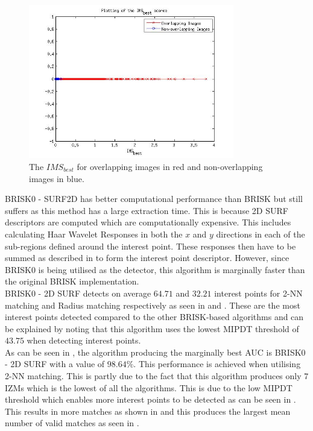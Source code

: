 \begin{figure}
  \centering
    \includegraphics[width=0.8\textwidth]{../Drawings/Matching/MatchingScore_BRISK0UBRISK.jpg}
    \caption{The $IMS_{best}$ for overlapping images in red and non-overlapping images in blue.} 
    \label{fig:ms_ubrisk}
\end{figure}

BRISK0 - SURF2D has better computational performance than BRISK but still suffers as this method has a large extraction time. This is because 2D SURF descriptors are computed which are computationally expensive. This includes calculating Haar Wavelet Responses in both the $x$ and $y$ directions in each of the sub-regions defined around the interest point. These responses then have to be summed as described in  to form the interest point descriptor. However, since BRISK0 is being utilised as the detector, this algorithm is marginally faster than the original BRISK implementation.\\

BRISK0 - 2D SURF detects on average $64.71$ and $32.21$ interest points for 2-NN matching and Radius matching respectively as seen in  and . These are the most interest points detected compared to the other BRISK-based algorithms and can be explained by noting that this algorithm uses the lowest MIPDT threshold of $43.75$ when detecting interest points. \\

As can be seen in , the algorithm producing the marginally best AUC is BRISK0 - 2D SURF with a value of $98.64\%$. This performance is achieved when utilising 2-NN matching. This is partly due to the fact that this algorithm produces only $7$ IZMs which is the lowest of all the algorithms. This is due to the low MIPDT threshold which enables more interest points to be detected as can be seen in . This results in more matches as shown in  and this produces the largest mean number of valid matches as seen in .\\


